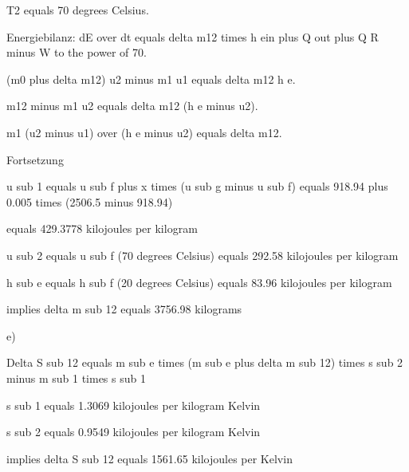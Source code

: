 T2 equals 70 degrees Celsius.

Energiebilanz:
dE over dt equals delta m12 times h ein plus Q out plus Q R minus W to the power of 70.

(m0 plus delta m12) u2 minus m1 u1 equals delta m12 h e.

m12 minus m1 u2 equals delta m12 (h e minus u2).

m1 (u2 minus u1) over (h e minus u2) equals delta m12.

Fortsetzung

u sub 1 equals u sub f plus x times (u sub g minus u sub f) equals 918.94 plus 0.005 times (2506.5 minus 918.94)

equals 429.3778 kilojoules per kilogram

u sub 2 equals u sub f (70 degrees Celsius) equals 292.58 kilojoules per kilogram

h sub e equals h sub f (20 degrees Celsius) equals 83.96 kilojoules per kilogram

implies delta m sub 12 equals 3756.98 kilograms

e)

Delta S sub 12 equals m sub e times (m sub e plus delta m sub 12) times s sub 2 minus m sub 1 times s sub 1

s sub 1 equals 1.3069 kilojoules per kilogram Kelvin

s sub 2 equals 0.9549 kilojoules per kilogram Kelvin

implies delta S sub 12 equals 1561.65 kilojoules per Kelvin